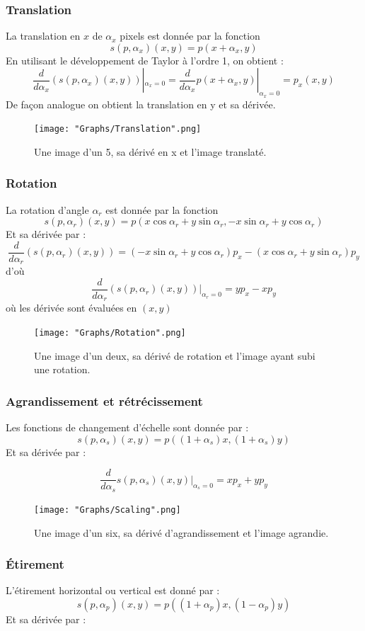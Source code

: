 \documentclass[a4paper,11pt,twoside]{report}
\begin{document}
\subsubsection{Translation}
La translation en $x$ de $\alpha_x$ pixels est donnée par la fonction $$s(p,\alpha_x)(x,y) = p(x+\alpha_x,y)$$ 
En utilisant le développement de Taylor à l'ordre 1, on obtient :
$$\frac{d}{d\alpha_x}(s(p,\alpha_x)(x,y))|_{\alpha_x=0} = \frac{d}{d\alpha_x}p(x+\alpha_x,y)|_{\alpha_x=0}=p_x(x,y)$$ 
De façon analogue on obtient la translation en y et sa dérivée.

\begin{figure}[H]
  	\texttt{[image: "Graphs/Translation".png]}
  	\caption{Une image d'un 5, sa dérivé en x et l'image translaté.}
\end{figure}

\subsubsection{Rotation}
La rotation d'angle $\alpha_r$ est donnée par la fonction $$s(p,\alpha_r)(x,y) = p(x\cos\alpha_r+y\sin\alpha_r,-x\sin\alpha_r+y\cos\alpha_r)$$ 
Et sa dérivée par :
$$\frac{d}{d\alpha_r}(s(p,\alpha_r)(x,y))= (-x\sin\alpha_r+y\cos\alpha_r)p_x - (x\cos\alpha_r+y\sin\alpha_r)p_y$$
d'où
$$\frac{d}{d\alpha_r}(s(p,\alpha_r)(x,y))|_{\alpha_r=0}=yp_x-xp_y$$ 
où les dérivée sont évaluées en $(x,y)$

\begin{figure}[H]
  	\texttt{[image: "Graphs/Rotation".png]}
  	\caption{Une image d'un deux, sa dérivé de rotation et l'image ayant subi une rotation.}
\end{figure}
\subsubsection{Agrandissement et rétrécissement}
Les fonctions de changement d'échelle sont donnée par : $$s(p,\alpha_s)(x,y) = p((1+\alpha_s)x,(1+\alpha_s)y)$$  
Et sa dérivée par :

$$\frac{d}{d\alpha_s}s(p,\alpha_s)(x,y)|_{\alpha_s=0}=xp_x+yp_y$$ 

\begin{figure}[H]
  	\texttt{[image: "Graphs/Scaling".png]}
  	\caption{Une image d'un six, sa dérivé d'agrandissement et l'image agrandie.}
\end{figure}

\subsubsection{Étirement}
L'étirement horizontal ou vertical est donné par : $$s(p,\alpha_p)(x,y) = p((1+\alpha_p)x,(1-\alpha_p)y)$$  
Et sa dérivée par :
\end{document}
